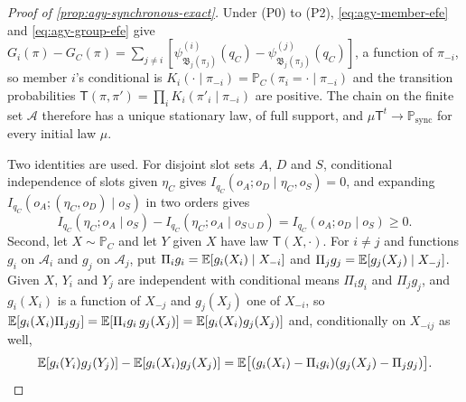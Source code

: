 \begin{proof}[Proof of \cref{prop:agy-synchronous-exact}]
Under (P0) to (P2), \eqref{eq:agy-member-efe} and \eqref{eq:agy-group-efe} give $G_i(\pi)-G_C(\pi)=\sum_{j\ne i}[\psi^{(i)}_{\mathfrak B_j(\pi_j)}(q_C)-\psi^{(j)}_{\mathfrak B_j(\pi_j)}(q_C)]$, a function of $\pi_{-i}$, so member $i$'s conditional is $K_i(\cdot\mid\pi_{-i})=\mathbb P_C(\pi_i=\cdot\mid\pi_{-i})$ and the transition probabilities $\mathsf T(\pi,\pi')=\prod_iK_i(\pi'_i\mid\pi_{-i})$ are positive. The chain on the finite set $\mathcal A$ therefore has a unique stationary law, of full support, and $\mu\mathsf T^t\to\mathbb P_{\mathrm{sync}}$ for every initial law $\mu$.

Two identities are used. For disjoint slot sets $A$, $D$ and $S$, conditional independence of slots given $\eta_C$ gives $I_{q_C}(o_A;o_D\mid\eta_C,o_S)=0$, and expanding $I_{q_C}(o_A;(\eta_C,o_D)\mid o_S)$ in two orders gives
\begin{equation}\label{eq:agy-sync-chain}
I_{q_C}(\eta_C;o_A\mid o_S)-I_{q_C}(\eta_C;o_A\mid o_{S\cup D})=I_{q_C}(o_A;o_D\mid o_S)\ge0.
\end{equation}
Second, let $X\sim\mathbb P_C$ and let $Y$ given $X$ have law $\mathsf T(X,\cdot)$. For $i\ne j$ and functions $g_i$ on $\mathcal A_i$ and $g_j$ on $\mathcal A_j$, put $\Pi_ig_i=\mathbb{E}[g_i(X_i)\mid X_{-i}]$ and $\Pi_jg_j=\mathbb{E}[g_j(X_j)\mid X_{-j}]$. Given $X$, $Y_i$ and $Y_j$ are independent with conditional means $\Pi_ig_i$ and $\Pi_jg_j$, and $g_i(X_i)$ is a function of $X_{-j}$ and $g_j(X_j)$ one of $X_{-i}$, so $\mathbb{E}[g_i(X_i)\Pi_jg_j]=\mathbb{E}[\Pi_ig_i\,g_j(X_j)]=\mathbb{E}[g_i(X_i)g_j(X_j)]$ and, conditionally on $X_{-ij}$ as well,
\begin{equation}\label{eq:agy-sync-residual}
\mathbb{E}[g_i(Y_i)g_j(Y_j)]-\mathbb{E}[g_i(X_i)g_j(X_j)]=\mathbb{E}\bigl[(g_i(X_i)-\Pi_ig_i)(g_j(X_j)-\Pi_jg_j)\bigr].
\end{equation}


\end{proof}
